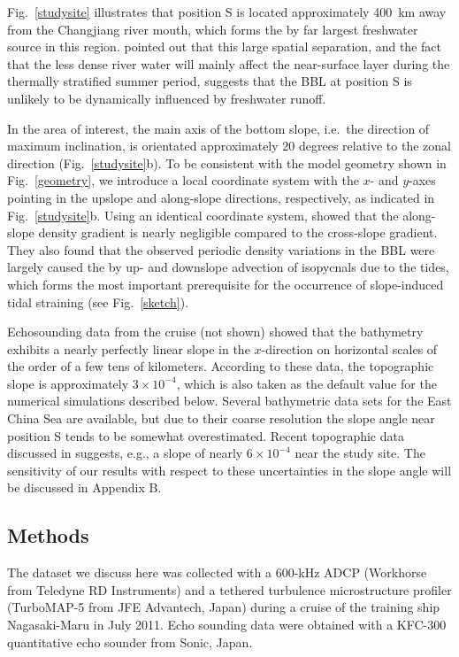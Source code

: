 Fig.\ \ref{studysite} illustrates that position S is located
approximately 400~km away from the Changjiang river mouth, which forms
the by far largest freshwater source in this
region. \cite{Endohetal2016a} pointed out that this large spatial
separation, and the fact that the less dense river water will mainly
affect the near-surface layer during the thermally stratified summer
period, suggests that the BBL at position S is unlikely to be
dynamically influenced by freshwater runoff.

In the area of interest, the main axis of the bottom slope, i.e.\ the
direction of maximum inclination, is orientated approximately $20$
degrees relative to the zonal direction (Fig.\ \ref{studysite}b). To
be consistent with the model geometry shown in Fig.\ \ref{geometry},
we introduce a local coordinate system with the $x$- and $y$-axes
pointing in the upslope and along-slope directions, respectively, as
indicated in Fig.\ \ref{studysite}b. Using an identical coordinate
system, \cite{Endohetal2016a} showed that the along-slope density
gradient is nearly negligible compared to the cross-slope
gradient. They also found that the observed periodic density
variations in the BBL were largely caused the by up- and downslope
advection of isopycnals due to the tides, which forms the most
important prerequisite for the occurrence of slope-induced tidal
straining (see Fig.\ \ref{sketch}).

Echosounding data from the cruise (not shown) showed that the
bathymetry exhibits a nearly perfectly linear slope in the
$x$-direction on horizontal scales of the order of a few tens of
kilometers. According to these data, the topographic slope is
approximately $3 \times 10^ {-4}$, which is also taken as the default
value for the numerical simulations described below. Several
bathymetric data sets for the East China Sea are available, but due to
their coarse resolution the slope angle near position S tends to be
somewhat overestimated. Recent topographic data discussed in
\cite{Choietal2002a} suggests, e.g., a slope of nearly $6 \times
10^{-4}$ near the study site. The sensitivity of our results with
respect to these uncertainties in the slope angle will be discussed
in Appendix B.

\subsection{Methods}

The dataset we discuss here was collected with a 600-kHz ADCP
(Workhorse from Teledyne RD Instruments) and a tethered turbulence
microstructure profiler (TurboMAP-5 from JFE Advantech, Japan) during
a cruise of the training ship Nagasaki-Maru in July 2011. Echo
sounding data were obtained with a KFC-300 quantitative echo sounder
from Sonic, Japan.

